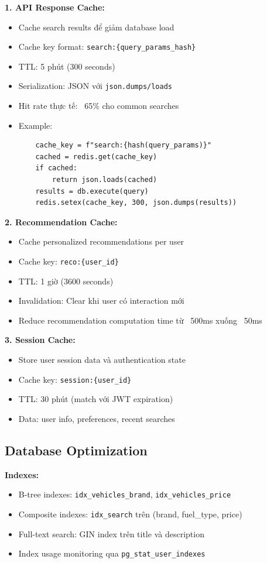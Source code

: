 \begin{itemize}
\textbf{1. API Response Cache:}
\begin{itemize}
    \item Cache search results để giảm database load
    \item Cache key format: \texttt{search:\{query\_params\_hash\}}
    \item TTL: 5 phút (300 seconds)
    \item Serialization: JSON với \texttt{json.dumps/loads}
    \item Hit rate thực tế: ~65\% cho common searches
    \item Example:
    \begin{verbatim}
    cache_key = f"search:{hash(query_params)}"
    cached = redis.get(cache_key)
    if cached:
        return json.loads(cached)
    results = db.execute(query)
    redis.setex(cache_key, 300, json.dumps(results))
    \end{verbatim}
\end{itemize}

\textbf{2. Recommendation Cache:}
\begin{itemize}
    \item Cache personalized recommendations per user
    \item Cache key: \texttt{reco:\{user\_id\}}
    \item TTL: 1 giờ (3600 seconds)
    \item Invalidation: Clear khi user có interaction mới
    \item Reduce recommendation computation time từ ~500ms xuống ~50ms
\end{itemize}

\textbf{3. Session Cache:}
\begin{itemize}
    \item Store user session data và authentication state
    \item Cache key: \texttt{session:\{user\_id\}}
    \item TTL: 30 phút (match với JWT expiration)
    \item Data: user info, preferences, recent searches
\end{itemize}

\subsection{Database Optimization}

\textbf{Indexes:}
\begin{itemize}
    \item B-tree indexes: \texttt{idx\_vehicles\_brand}, \texttt{idx\_vehicles\_price}
    \item Composite indexes: \texttt{idx\_search} trên (brand, fuel\_type, price)
    \item Full-text search: GIN index trên title và description
    \item Index usage monitoring qua \texttt{pg\_stat\_user\_indexes}
\end{itemize}


\end{itemize}
